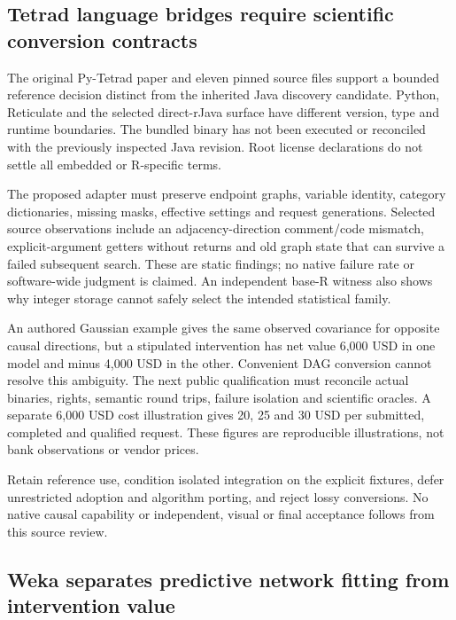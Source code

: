 \hypertarget{tetrad-language-bridges-require-scientific-conversion-contracts}{%
\subsection{Tetrad language bridges require scientific conversion
contracts}\label{tetrad-language-bridges-require-scientific-conversion-contracts}}

The original Py-Tetrad paper and eleven pinned source files support a
bounded reference decision distinct from the inherited Java discovery
candidate. Python, Reticulate and the selected direct-rJava surface have
different version, type and runtime boundaries. The bundled binary has
not been executed or reconciled with the previously inspected Java
revision. Root license declarations do not settle all embedded or
R-specific terms.\citep{exec24_pytetrad_paper,exec24_pytetrad_source}

The proposed adapter must preserve endpoint graphs, variable identity,
category dictionaries, missing masks, effective settings and request
generations. Selected source observations include an adjacency-direction
comment/code mismatch, explicit-argument getters without returns and old
graph state that can survive a failed subsequent search. These are
static findings; no native failure rate or software-wide judgment is
claimed. An independent base-R witness also shows why integer storage
cannot safely select the intended statistical
family.\citep{exec24_pytetrad_source,exec24_pytetrad_choice}

An authored Gaussian example gives the same observed covariance for
opposite causal directions, but a stipulated intervention has net value
6,000 USD in one model and minus 4,000 USD in the other. Convenient DAG
conversion cannot resolve this ambiguity. The next public qualification
must reconcile actual binaries, rights, semantic round trips, failure
isolation and scientific oracles. A separate 6,000 USD cost illustration
gives 20, 25 and 30 USD per submitted, completed and qualified request.
These figures are reproducible illustrations, not bank observations or
vendor prices.\citep{exec24_pytetrad_choice}

Retain reference use, condition isolated integration on the explicit
fixtures, defer unrestricted adoption and algorithm porting, and reject
lossy conversions. No native causal capability or independent, visual or
final acceptance follows from this source
review.\citep{exec24_pytetrad_choice}

\hypertarget{weka-separates-predictive-network-fitting-from-intervention-value}{%
\subsection{Weka separates predictive network fitting from intervention
value}\label{weka-separates-predictive-network-fitting-from-intervention-value}}

